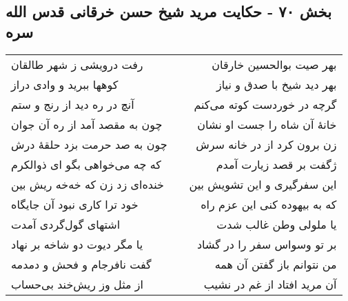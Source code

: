 \begin{center}
\section*{بخش ۷۰ - حکایت مرید شیخ حسن خرقانی قدس الله سره}
\label{sec:sh070}
\begin{longtable}{l p{0.5cm} r}
رفت درویشی ز شهر طالقان
&&
بهر صیت بوالحسین خارقان
\\
کوهها ببرید و وادی دراز
&&
بهر دید شیخ با صدق و نیاز
\\
آنچ در ره دید از رنج و ستم
&&
گرچه در خوردست کوته می‌کنم
\\
چون به مقصد آمد از ره آن جوان
&&
خانهٔ آن شاه را جست او نشان
\\
چون به صد حرمت بزد حلقهٔ درش
&&
زن برون کرد از در خانه سرش
\\
که چه می‌خواهی بگو ای ذوالکرم
&&
ژگفت بر قصد زیارت آمدم
\\
خنده‌ای زد زن که خه‌خه ریش بین
&&
این سفرگیری و این تشویش بین
\\
خود ترا کاری نبود آن جایگاه
&&
که به بیهوده کنی این عزم راه
\\
اشتهای گول‌گردی آمدت
&&
یا ملولی وطن غالب شدت
\\
یا مگر دیوت دو شاخه بر نهاد
&&
بر تو وسواس سفر را در گشاد
\\
گفت نافرجام و فحش و دمدمه
&&
من نتوانم باز گفتن آن همه
\\
از مثل وز ریش‌خند بی‌حساب
&&
آن مرید افتاد از غم در نشیب
\\
\end{longtable}
\end{center}
